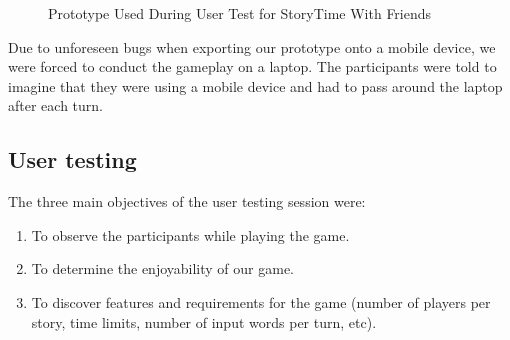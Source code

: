 \documentclass{sigchi}
\begin{document}
\begin{figure}[H]
\hfill
{}
\hfill
{}
\hfill
\caption{Prototype Used During User Test for StoryTime With Friends}
\label{fig:prototype}
\end{figure}

Due to unforeseen bugs when exporting our prototype onto a mobile device, we were forced to conduct the gameplay on a laptop. The participants were told to imagine that they were using a mobile device and had to pass around the laptop after each turn. 


\subsection{User testing}
The three main objectives of the user testing session were:

\begin{enumerate}[leftmargin=.5in,noitemsep]
\item To observe the participants while playing the game.
\item To determine the enjoyability of our game.
\item To discover features and requirements for the game (number of players per story, time limits, number of input words per turn, etc).
\end{enumerate}
\end{document}
